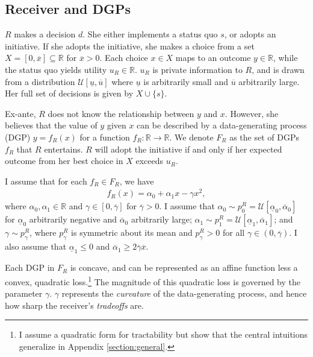 \documentclass[11pt,dvipsnames]{article}
\newcommand{\xlow}{0}
\begin{document}
\subsection{Receiver and DGPs}
$R$ makes a decision $d$. She either implements a status quo $s$, or adopts an initiative.
If she adopts the initiative, she makes a choice from a set $X=[\xlow,\overline{x}] \subseteq \mathbb{R}$ for $\overline{x}>\xlow$.
Each choice $x\in X$ maps to an outcome $y \in \mathbb{R}$, while the status quo yields utility $u_R \in \mathbb{R}$.
$u_R$ is private information to $R$, and is drawn from a distribution $\mathcal{U}[\underline{u},\overline{u}]$ where $\underline{u}$ is arbitrarily small and $\overline{u}$ arbitrarily large.
Her full set of decisions is given by $X\cup\{s\}$.

Ex-ante, $R$ does not know the relationship between $y$ and $x$. However, she believes that the value of $y$ given $x$ can be described by a data-generating process (DGP) $y = f_R(x)$ for a function $f_R : \mathbb{R} \to \mathbb{R}$.
We denote $F_R$ as the set of DGPs $f_R$ that $R$ entertains.
$R$ will adopt the initiative if and only if her expected outcome from her best choice in $X$ exceeds $u_R$.

I assume that for each $f_R \in F_R$, we have
	\begin{align*}
	f_R(x) = \alpha_0 + \alpha_1 x - \gamma x^2,	
	\end{align*}
	where $\alpha_0, \alpha_1 \in \mathbb{R}$ and $\gamma \in [0,\overline{\gamma}]$ for $\overline{\gamma}>0$.
I assume that $\alpha_0 \sim p_0^R = \mathcal{U}[\underline{\alpha}_0,\overline{\alpha}_0]$ for $\underline{\alpha}_0$ arbitrarily negative and $\overline{\alpha}_0$ arbitrarily large;
$\alpha_1 \sim p_1^R = \mathcal{U}[\underline{\alpha}_1,\overline{\alpha}_1]$;
and $\gamma \sim p_\gamma^R$, where $p_\gamma^R$ is symmetric about its mean and $p_\gamma^R > 0$ for all $\gamma \in (0,\overline{\gamma})$.	
I also assume that $\underline{\alpha}_1\leq 0$ and $\overline{\alpha}_1\geq 2 \overline{\gamma}\overline{x}$.
	
Each DGP in $F_R$ is concave, and can be represented as an affine function less a convex, quadratic loss.\footnote{I assume a quadratic form for tractability but show that the central intuitions generalize in Appendix \ref{section:general}.}
The magnitude of this quadratic loss is governed by the parameter $\gamma$.
$\gamma$ represents the \emph{curvature} of the data-generating process, and hence how sharp the receiver's \emph{tradeoffs} are.
\end{document}
